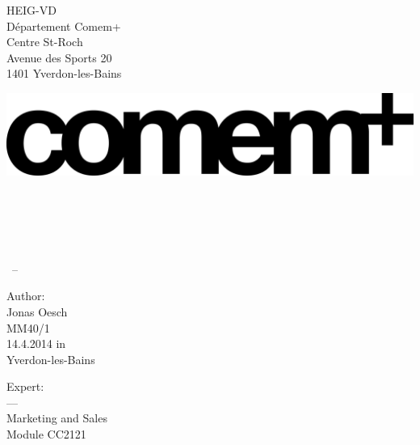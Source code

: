 
\begin{titlepage}

\begin{minipage}{0.7\textwidth}
HEIG-VD \\
Département Comem+ \\
Centre St-Roch \\
Avenue des Sports 20 \\
1401 Yverdon-les-Bains
\end{minipage}
\begin{minipage}{0.3\textwidth}
	\begin{flushright}
		\includegraphics[width=1\textwidth]{./img/comemLogo.png}~
	\end{flushright}
\end{minipage}

\begin{addmargin}[-1cm]{-3cm}
\begin{center}
\large

\hfill
\vfill

\begingroup
\color{Maroon}\spacedallcaps{\myTitle} \\ \bigskip %
\endgroup

\spacedlowsmallcaps{\myName} %

\vfill


\mySubtitle \\ \medskip %

\myTime\ -- \myVersion %

\vfill

\end{center}
\end{addmargin}

\begin{minipage}{0.5\textwidth}
Author: \\
Jonas Oesch \\
MM40/1 \\
14.4.2014 in \\
Yverdon-les-Bains
\end{minipage}
\begin{minipage}{0.5\textwidth}
	\begin{flushright}
		Expert: \\
		--- \\
		Marketing and Sales \\
		Module CC2121
	\end{flushright}
\end{minipage}

\end{titlepage}
